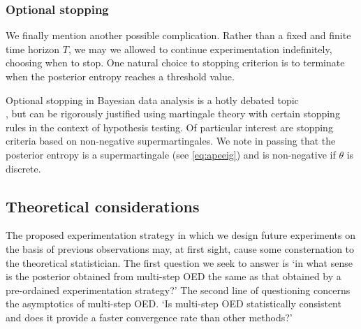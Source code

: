 \subsubsection{Optional stopping}
\label{sec:optstop}
We finally mention another possible complication. Rather than a fixed and finite time horizon $T$, we may we allowed to continue experimentation indefinitely, choosing when to stop. One natural choice to stopping criterion is to terminate when the posterior entropy reaches a threshold value.

Optional stopping in Bayesian data analysis is a hotly debated topic \\ \cite{rouder2014, de2017}, but can be rigorously justified using martingale theory with certain stopping rules \cite{shafer2011} in the context of hypothesis testing. Of particular interest are stopping criteria based on non-negative supermartingales. We note in passing that the posterior entropy is a supermartingale (see \eqref{eq:apeeig}) and is non-negative if $\theta$ is discrete.


\subsection{Theoretical considerations}
The proposed experimentation strategy in which we design future experiments on the basis of previous observations may, at first sight, cause some consternation to the theoretical statistician. The first question we seek to answer is `in what sense is the posterior obtained from multi-step OED the same as that obtained by a pre-ordained experimentation strategy?' The second line of questioning concerns the asymptotics of multi-step OED. `Is multi-step OED statistically consistent and does it provide a faster convergence rate than other methods?'

